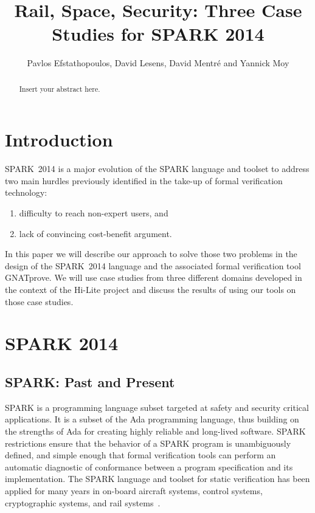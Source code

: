 \documentclass{article}
\newcommand{\hilite}{Hi-Lite\xspace}
\newcommand{\gnatprove}{GNATprove\xspace}
\newcommand{\newspark}{SPARK~2014\xspace}
\begin{document}
\title{Rail, Space, Security: Three Case Studies for SPARK 2014}

\author{Pavlos Efstathopoulos, David Lesens, David Mentré and Yannick Moy}

\date{}

\maketitle

\begin{abstract}
Insert your abstract here.
\end{abstract}

\section{Introduction}

\newspark is a major evolution of the SPARK language and toolset to address two
main hurdles previously identified in the take-up of formal verification
technology:
%
\begin{enumerate}
\item difficulty to reach non-expert users, and
\item lack of convincing cost-benefit argument.
\end{enumerate}

In this paper we will describe our approach to solve those two problems in the
design of the \newspark language and the associated formal verification tool
\gnatprove. We will use case studies from three different domains developed in
the context of the \hilite project and discuss the results of using our tools
on those case studies.

\section{SPARK 2014}

\subsection{SPARK: Past and Present}

SPARK is a programming language subset targeted at safety and security critical
applications. It is a subset of the Ada programming language, thus building on
the strengths of Ada for creating highly reliable and long-lived
software. SPARK restrictions ensure that the behavior of a SPARK program is
unambiguously defined, and simple enough that formal verification tools can
perform an automatic diagnostic of conformance between a program specification
and its implementation. The SPARK language and toolset for static verification
has been applied for many years in on-board aircraft systems, control systems,
cryptographic systems, and rail systems~\cite{sparkbook2012,oneill2012}.
\end{document}

